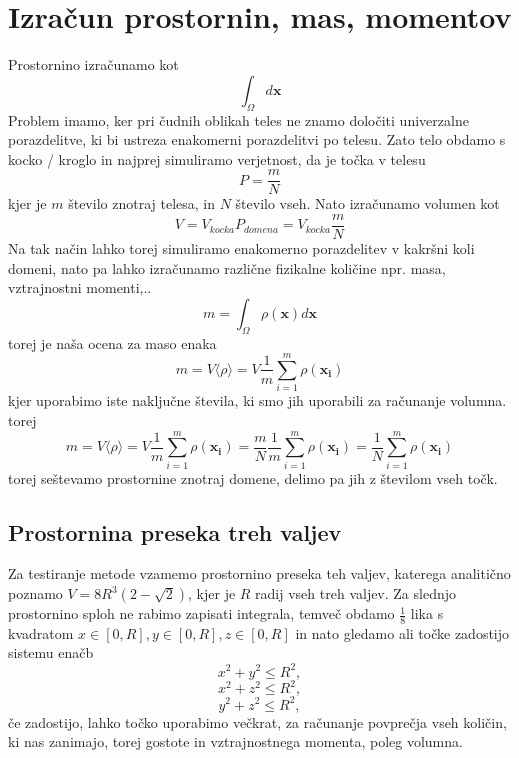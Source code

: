 \documentclass[11pt, a4paper]{article}
\begin{document}
\section{Izračun prostornin, mas, momentov}
Prostornino izračunamo kot
\begin{equation}
 \int_{\Omega}   d \mathbf{x}
\end{equation} 
Problem imamo, ker pri čudnih oblikah teles ne znamo določiti univerzalne porazdelitve, ki bi ustreza enakomerni porazdelitvi po telesu. Zato telo obdamo s kocko / kroglo in najprej simuliramo verjetnost, da je točka v telesu
\begin{equation}
P = \frac{m}{N}
\end{equation}
kjer je $m$ število znotraj telesa, in $N$ število vseh.
Nato izračunamo volumen kot
\begin{equation}
V =  V_{kocka} P_{domena} = V_{kocka} \frac{m}{N}
\end{equation}
Na tak način lahko torej simuliramo enakomerno porazdelitev v kakršni koli domeni, nato pa lahko izračunamo različne fizikalne količine npr. masa, vztrajnostni momenti,..
\begin{equation}
m = \int_{\Omega}  \rho(\mathbf{x}) d \mathbf{x}
\end{equation}
torej je naša ocena za maso enaka
\begin{equation}
m = V  \langle \rho \rangle = V \frac{1}{m} \sum _{{i=1}}^{m} \rho(\mathbf{x_i})
\end{equation}
kjer uporabimo iste naključne števila, ki smo jih uporabili za računanje volumna.
 torej 
\begin{equation}
m = V  \langle \rho \rangle = V \frac{1}{m} \sum _{{i=1}}^{m} \rho(\mathbf{x_i}) =   \frac{m}{N} \frac{1}{m} \sum _{{i=1}}^{m} \rho(\mathbf{x_i}) =  \frac{1}{N} \sum _{{i=1}}^{m} \rho(\mathbf{x_i})
\end{equation}
torej seštevamo prostornine znotraj domene, delimo pa jih z številom vseh točk.

\subsection{Prostornina preseka treh valjev}
Za testiranje metode vzamemo prostornino preseka teh valjev, katerega analitično poznamo $V = 8R^3 (2-\sqrt{2})$, kjer je $R$ radij vseh treh valjev.\newline\newline
Za slednjo prostornino sploh ne rabimo zapisati integrala, temveč obdamo $\frac{1}{8}$ lika s kvadratom $x \in [0,R], y \in [0,R], z \in [0,R]$ in nato gledamo ali točke zadostijo sistemu enačb 
\[
x^2 + y^2 \leq R^2,
\]
\begin{equation}
x^2 + z^2 \leq R^2,
\end{equation}
\[
y^2 + z^2 \leq R^2,
\]
če zadostijo, lahko točko uporabimo večkrat, za računanje povprečja vseh količin, ki nas zanimajo, torej gostote in vztrajnostnega momenta, poleg volumna.
\end{document}
